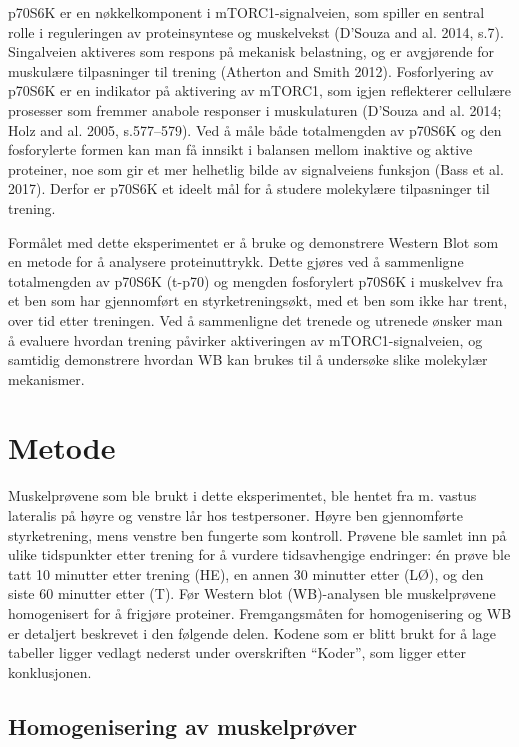 \documentclass[
  letterpaper,
  DIV=11,
  numbers=noendperiod]{scrreprt}
\begin{document}
p70S6K er en nøkkelkomponent i mTORC1-signalveien, som spiller en
sentral rolle i reguleringen av proteinsyntese og muskelvekst (D'Souza
and al. 2014, s.7). Singalveien aktiveres som respons på mekanisk
belastning, og er avgjørende for muskulære tilpasninger til trening
(Atherton and Smith 2012). Fosforlyering av p70S6K er en indikator på
aktivering av mTORC1, som igjen reflekterer cellulære prosesser som
fremmer anabole responser i muskulaturen (D'Souza and al. 2014; Holz and
al. 2005, s.577--579). Ved å måle både totalmengden av p70S6K og den
fosforylerte formen kan man få innsikt i balansen mellom inaktive og
aktive proteiner, noe som gir et mer helhetlig bilde av signalveiens
funksjon (Bass et al. 2017). Derfor er p70S6K et ideelt mål for å
studere molekylære tilpasninger til trening.

Formålet med dette eksperimentet er å bruke og demonstrere Western Blot
som en metode for å analysere proteinuttrykk. Dette gjøres ved å
sammenligne totalmengden av p70S6K (t-p70) og mengden fosforylert p70S6K
i muskelvev fra et ben som har gjennomført en styrketreningsøkt, med et
ben som ikke har trent, over tid etter treningen. Ved å sammenligne det
trenede og utrenede ønsker man å evaluere hvordan trening påvirker
aktiveringen av mTORC1-signalveien, og samtidig demonstrere hvordan WB
kan brukes til å undersøke slike molekylær mekanismer.

\section{Metode}\label{metode-6}

Muskelprøvene som ble brukt i dette eksperimentet, ble hentet fra m.
vastus lateralis på høyre og venstre lår hos testpersoner. Høyre ben
gjennomførte styrketrening, mens venstre ben fungerte som kontroll.
Prøvene ble samlet inn på ulike tidspunkter etter trening for å vurdere
tidsavhengige endringer: én prøve ble tatt 10 minutter etter trening
(HE), en annen 30 minutter etter (LØ), og den siste 60 minutter etter
(T). Før Western blot (WB)-analysen ble muskelprøvene homogenisert for å
frigjøre proteiner. Fremgangsmåten for homogenisering og WB er detaljert
beskrevet i den følgende delen. Kodene som er blitt brukt for å lage
tabeller ligger vedlagt nederst under overskriften ``Koder'', som ligger
etter konklusjonen.

\subsection{Homogenisering av
muskelprøver}\label{homogenisering-av-muskelpruxf8ver}
\end{document}
